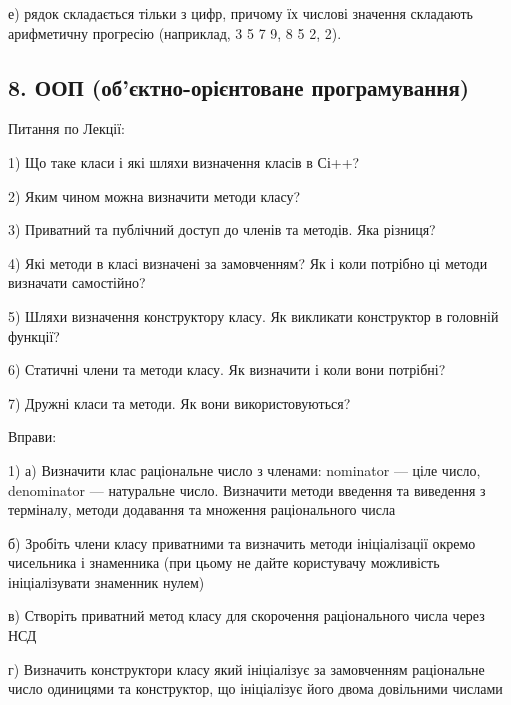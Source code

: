 \documentclass[]{article}
\begin{document}
е) рядок складається тільки з цифр, причому їх числові значення
складають арифметичну прогресію (наприклад, 3 5 7 9, 8 5 2, 2).

\subsection{}\label{section-1}

\subsection{8. ООП (об'єктно-орієнтоване
програмування)}\label{ux43eux43eux43f-ux43eux431ux454ux43aux442ux43dux43e-ux43eux440ux456ux454ux43dux442ux43eux432ux430ux43dux435-ux43fux440ux43eux433ux440ux430ux43cux443ux432ux430ux43dux43dux44f}

\begin{quote}
\protect\hypertarget{_Hlk57988688}{}{}
\end{quote}

Питання по Лекції:

1) Що таке класи і які шляхи визначення класів в Сі++?

2) Яким чином можна визначити методи класу?

3) Приватний та публічний доступ до членів та методів. Яка різниця?

4) Які методи в класі визначені за замовченням? Як і коли потрібно ці
методи визначати самостійно?

5) Шляхи визначення конструктору класу. Як викликати конструктор в
головній функції?

6) Статичні члени та методи класу. Як визначити і коли вони потрібні?

7) Дружні класи та методи. Як вони використовуються?

Вправи:

1) а) Визначити клас раціональне число з членами: nominator --- ціле
число, denominator --- натуральне число. Визначити методи введення та
виведення з терміналу, методи додавання та множення раціонального числа

б) Зробіть члени класу приватними та визначить методи ініціалізації
окремо чисельника і знаменника (при цьому не дайте користувачу
можливість ініціалізувати знаменник нулем)

в) Створіть приватний метод класу для скорочення раціонального числа
через НСД

г) Визначить конструктори класу який ініціалізує за замовченням
раціональне число одиницями та конструктор, що ініціалізує його двома
довільними числами
\end{document}
